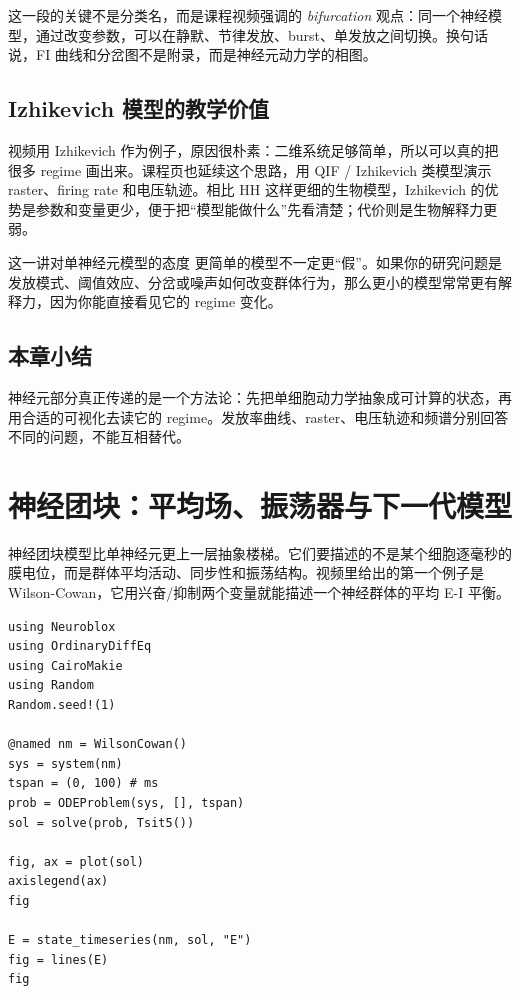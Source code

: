 \documentclass[a4paper]{article}
\begin{document}
这一段的关键不是分类名，而是课程视频强调的 \emph{bifurcation} 观点：同一个神经模型，通过改变参数，可以在静默、节律发放、burst、单发放之间切换。换句话说，FI 曲线和分岔图不是附录，而是神经元动力学的相图。

\subsection{Izhikevich 模型的教学价值}
视频用 Izhikevich 作为例子，原因很朴素：二维系统足够简单，所以可以真的把很多 regime 画出来。课程页也延续这个思路，用 QIF / Izhikevich 类模型演示 raster、firing rate 和电压轨迹。相比 HH 这样更细的生物模型，Izhikevich 的优势是参数和变量更少，便于把“模型能做什么”先看清楚；代价则是生物解释力更弱。

\begin{importantbox}{这一讲对单神经元模型的态度}
更简单的模型不一定更“假”。如果你的研究问题是发放模式、阈值效应、分岔或噪声如何改变群体行为，那么更小的模型常常更有解释力，因为你能直接看见它的 regime 变化。
\end{importantbox}

\subsection{本章小结}
神经元部分真正传递的是一个方法论：先把单细胞动力学抽象成可计算的状态，再用合适的可视化去读它的 regime。发放率曲线、raster、电压轨迹和频谱分别回答不同的问题，不能互相替代。

\section{神经团块：平均场、振荡器与下一代模型}
神经团块模型比单神经元更上一层抽象楼梯。它们要描述的不是某个细胞逐毫秒的膜电位，而是群体平均活动、同步性和振荡结构。视频里给出的第一个例子是 Wilson-Cowan，它用兴奋/抑制两个变量就能描述一个神经群体的平均 E-I 平衡。

\begin{lstlisting}[caption={Wilson-Cowan Blox 的标准仿真与状态提取。},label={lst:wilson-cowan}]
using Neuroblox
using OrdinaryDiffEq
using CairoMakie
using Random
Random.seed!(1)

@named nm = WilsonCowan()
sys = system(nm)
tspan = (0, 100) # ms
prob = ODEProblem(sys, [], tspan)
sol = solve(prob, Tsit5())

fig, ax = plot(sol)
axislegend(ax)
fig

E = state_timeseries(nm, sol, "E")
fig = lines(E)
fig
\end{lstlisting}
\end{document}
